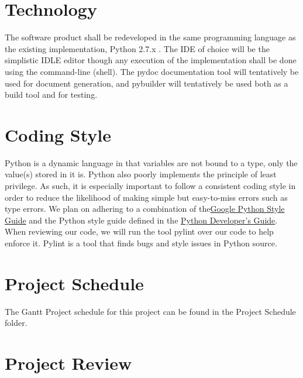 \documentclass{article}
\begin{document}
\section{Technology}

\indent The software product shall be redeveloped in the
same programming language as the existing implementation, Python 2.7.x . The IDE
of choice will be the simplistic IDLE editor though any execution of the
implementation shall be done using the command-line (shell). The pydoc
documentation tool will tentatively be used for document generation, and
pybuilder will tentatively be used both as a build tool and for testing.

\section{Coding Style} 

\indent Python is a dynamic language in that variables are not bound to a
type, only the value(s) stored in it is. Python also poorly implements the
principle of least privilege. As such, it is especially important to follow a
consistent coding style in order to reduce the likelihood of making simple but
easy-to-miss errors such as type errors. We plan on adhering to a combination 
of the\href{https://google.github.io/styleguide/pyguide.html}
{Google Python Style Guide} and the Python style guide defined in the 
\href{https://www.python.org/dev/peps/pep-0008/} {Python Developer's Guide}.
When reviewing our code, we will run the tool pylint over our code to help
enforce it. Pylint is a tool that finds bugs and style issues in Python source.

\section{Project Schedule} 

\noindent The Gantt Project schedule for this project can be found in the
Project Schedule folder.

\section{Project Review} 
\end{document}
